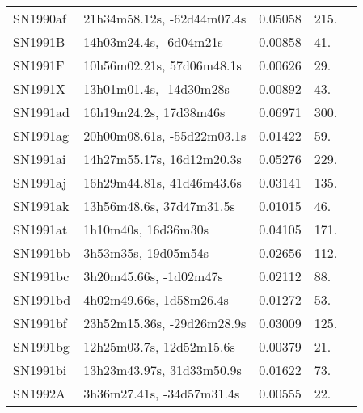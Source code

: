 \begin{longtable}{lllll}
         SN1990af &     21h34m58.12s, -62d44m07.4s &  0.05058 &           215. &    \citet{20096dF...C...0000J} \\
          SN1991B &         14h03m24.4s, -6d04m21s &  0.00858 &            41. &    \citet{2005AJ....130.1037C} \\
          SN1991F &      10h56m02.21s, 57d06m48.1s &  0.00626 &            29. &    \citet{2011MNRAS.413..813C} \\
          SN1991X &        13h01m01.4s, -14d30m28s &  0.00892 &            43. &  \citet{2007AandA...465...71T} \\
         SN1991ad &         16h19m24.2s, 17d38m46s &  0.06971 &           300. &    \citet{1991IAUC.5271....1M} \\
         SN1991ag &     20h00m08.61s, -55d22m03.1s &  0.01422 &            59. &    \citet{2006HIPAS.C...0000:} \\
         SN1991ai &      14h27m55.17s, 16d12m20.3s &  0.05276 &           229. &    \citet{2006AJ....132..197W} \\
         SN1991aj &      16h29m44.81s, 41d46m43.6s &  0.03141 &           135. &    \citet{2004SDSS2.C...0000:} \\
         SN1991ak &       13h56m48.6s, 37d47m31.5s &  0.01015 &            46. &    \citet{1995ApJS...99..391H} \\
         SN1991at &            1h10m40s, 16d36m30s &  0.04105 &           171. &    \citet{1993AJ....105.1271G} \\
         SN1991bb &            3h53m35s, 19d05m54s &  0.02656 &           112. &    \citet{1993AJ....105.1271G} \\
         SN1991bc &         3h20m45.66s, -1d02m47s &  0.02112 &            88. &  \citet{2007AandA...465...71T} \\
         SN1991bd &        4h02m49.66s, 1d58m26.4s &  0.01272 &            53. &    \citet{1991RC3.9.C...0000d} \\
         SN1991bf &     23h52m15.36s, -29d26m28.9s &  0.03009 &           125. &    \citet{1999AJ....118.1468D} \\
         SN1991bg &       12h25m03.7s, 12d52m15.6s &  0.00379 &            21. &    \citet{2009MNRAS.394.1249C} \\
         SN1991bi &      13h23m43.97s, 31d33m50.9s &  0.01622 &            73. &    \citet{2006AJ....132..197W} \\
          SN1992A &      3h36m27.41s, -34d57m31.4s &  0.00555 &            22. &  \citet{2004AandA...415..123P} \\

\end{longtable}
